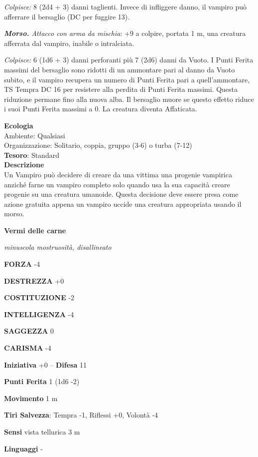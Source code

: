 \begin{multicols}{2}
\textit{Colpisce:} 8 (2d4 + 3) danni taglienti. Invece di infliggere danno, il vampiro può afferrare il bersaglio (DC per fuggire 13).

\textit{\textbf{Morso.} Attacco con arma da mischia}: +9 a colpire, portata 1 m, una creatura afferrata dal vampiro, inabile o intralciata.

\textit{Colpisce:} 6 (1d6 + 3) danni perforanti più 7 (2d6) danni da Vuoto. I Punti Ferita massimi del bersaglio sono ridotti di un ammontare pari al danno da Vuoto subito, e il vampiro recupera un numero di Punti Ferita pari a quell'ammontare, TS Tempra DC 16 per resistere alla perdita di Punti Ferita massimi. Questa riduzione permane fino alla nuova alba. Il bersaglio muore se questo effetto riduce i suoi Punti Ferita massimi a 0. La creatura diventa Affaticata.

\textbf{Ecologia}\\
Ambiente: Qualsiasi\\
Organizzazione: Solitario, coppia, gruppo (3-6) o turba (7-12)\\
\textbf{Tesoro}: Standard\\
\textbf{Descrizione}\\
Un Vampiro può decidere di creare da una vittima una progenie vampirica anziché farne un vampiro completo solo quando usa la sua capacità creare progenie su una creatura umanoide. Questa decisione deve essere presa come azione gratuita appena un vampiro uccide una creatura appropriata usando il morso.

\medskip{}\textbf{Vermi delle carne}

\textit{minuscola mostruosità, disallineato}

\textbf{FORZA} -4

\textbf{DESTREZZA} +0

\textbf{COSTITUZIONE} -2

\textbf{INTELLIGENZA} -4

\textbf{SAGGEZZA} 0

\textbf{CARISMA} -4

\textbf{Iniziativa} +0 -- \textbf{Difesa} 11

\textbf{Punti Ferita} 1 (1d6 -2)

\textbf{Movimento} 1 m

\textbf{Tiri Salvezza}: Tempra -1, Riflessi +0, Volontà -4

\textbf{Sensi} vista tellurica 3 m

\textbf{Linguaggi} -


\end{multicols}
